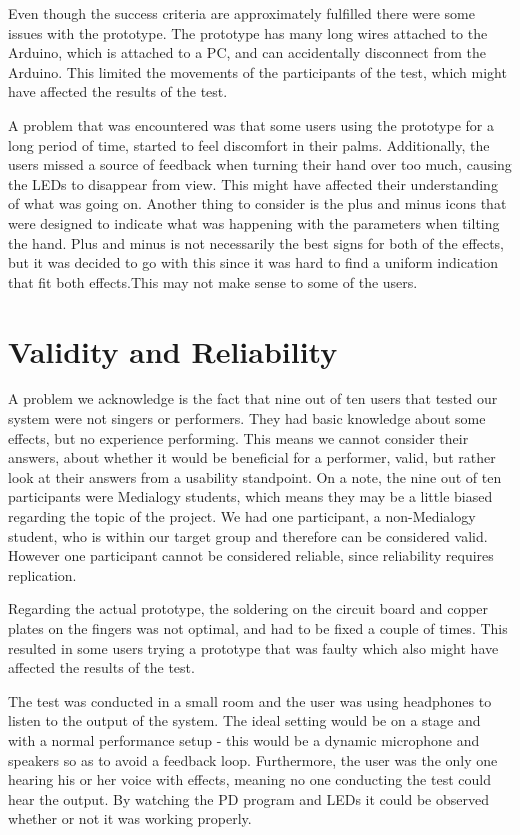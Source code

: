 Even though the success criteria are approximately fulfilled there were some issues with the prototype. The prototype has many long wires attached to the Arduino, which is attached to a PC, and can accidentally disconnect from the Arduino. This limited the movements of the participants of the test, which might have affected the results of the test.

A problem that was encountered was that some users using the prototype for a long period of time, started to feel discomfort in their palms. 
Additionally, the users missed a source of feedback when turning their hand over too much, causing the LEDs to disappear from view. This might have affected their understanding of what was going on.
Another thing to consider is the plus and minus icons that were designed to indicate what was happening with the parameters when tilting the hand. Plus and minus is not necessarily the best signs for both of the effects, but it was decided to go with this since it was hard to find a uniform indication that fit both effects.This may not make sense to some of the users.

\section{Validity and Reliability}

A problem we acknowledge is the fact that nine out of ten users that tested our system were not singers or performers. They had basic knowledge about some effects, but no experience performing. This means we cannot consider their answers, about whether it would be beneficial for a performer, valid, but rather look at their answers from a usability standpoint. On a note, the nine out of ten participants were Medialogy students, which means they may be a little biased regarding the topic of the project.
We had one participant, a non-Medialogy student, who is within our target group and therefore can be considered valid. However one participant cannot be considered reliable, since reliability requires replication.

Regarding the actual prototype, the soldering on the circuit board and copper plates on the fingers was not optimal, and had to be fixed a couple of times. This resulted in some users  trying a prototype that was faulty which also might have affected the results of the test.

The test was conducted in a small room and the user was using headphones to listen to the output of the system. The ideal setting would be on a stage and with a normal performance setup - this would be a dynamic microphone and speakers so as to avoid a feedback loop. 
Furthermore, the user was the only one hearing his or her voice with effects, meaning no one conducting the test could hear the output. By watching the PD program and LEDs it could be observed whether or not it was working properly.

